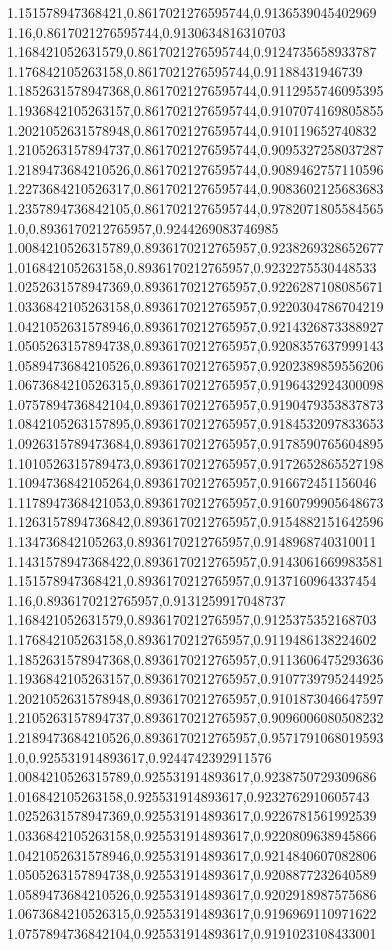 1.151578947368421,0.8617021276595744,0.9136539045402969
1.16,0.8617021276595744,0.9130634816310703
1.168421052631579,0.8617021276595744,0.9124735658933787
1.176842105263158,0.8617021276595744,0.91188431946739
1.1852631578947368,0.8617021276595744,0.9112955746095395
1.1936842105263157,0.8617021276595744,0.9107074169805855
1.2021052631578948,0.8617021276595744,0.910119652740832
1.2105263157894737,0.8617021276595744,0.9095327258037287
1.2189473684210526,0.8617021276595744,0.9089462757110596
1.2273684210526317,0.8617021276595744,0.9083602125683683
1.2357894736842105,0.8617021276595744,0.9782071805584565
1.0,0.8936170212765957,0.9244269083746985
1.0084210526315789,0.8936170212765957,0.9238269328652677
1.016842105263158,0.8936170212765957,0.9232275530448533
1.0252631578947369,0.8936170212765957,0.9226287108085671
1.0336842105263158,0.8936170212765957,0.9220304786704219
1.0421052631578946,0.8936170212765957,0.9214326873388927
1.0505263157894738,0.8936170212765957,0.9208357637999143
1.0589473684210526,0.8936170212765957,0.9202389859556206
1.0673684210526315,0.8936170212765957,0.9196432924300098
1.0757894736842104,0.8936170212765957,0.9190479353837873
1.0842105263157895,0.8936170212765957,0.9184532097833653
1.0926315789473684,0.8936170212765957,0.9178590765604895
1.1010526315789473,0.8936170212765957,0.9172652865527198
1.1094736842105264,0.8936170212765957,0.916672451156046
1.1178947368421053,0.8936170212765957,0.9160799905648673
1.1263157894736842,0.8936170212765957,0.9154882151642596
1.134736842105263,0.8936170212765957,0.9148968740310011
1.1431578947368422,0.8936170212765957,0.9143061669983581
1.151578947368421,0.8936170212765957,0.9137160964337454
1.16,0.8936170212765957,0.9131259917048737
1.168421052631579,0.8936170212765957,0.9125375352168703
1.176842105263158,0.8936170212765957,0.9119486138224602
1.1852631578947368,0.8936170212765957,0.9113606475293636
1.1936842105263157,0.8936170212765957,0.9107739795244925
1.2021052631578948,0.8936170212765957,0.9101873046647597
1.2105263157894737,0.8936170212765957,0.9096006080508232
1.2189473684210526,0.8936170212765957,0.9571791068019593
1.0,0.925531914893617,0.9244742392911576
1.0084210526315789,0.925531914893617,0.9238750729309686
1.016842105263158,0.925531914893617,0.9232762910605743
1.0252631578947369,0.925531914893617,0.9226781561992539
1.0336842105263158,0.925531914893617,0.9220809638945866
1.0421052631578946,0.925531914893617,0.9214840607082806
1.0505263157894738,0.925531914893617,0.9208877232640589
1.0589473684210526,0.925531914893617,0.9202918987575686
1.0673684210526315,0.925531914893617,0.9196969110971622
1.0757894736842104,0.925531914893617,0.9191023108433001

